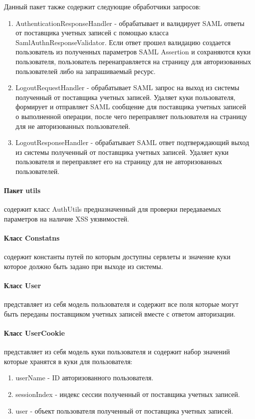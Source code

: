 Данный пакет также содержит следующие обработчики запросов:
\begin{enumerate}
\item AuthenticationResponseHandler - обрабатывает и валидирует SAML ответы от поставщика учетных записей с помощью класса SamlAuthnResponseValidator. Если ответ прошел валидацию создается пользователь из полученных параметров SAML Assertion и сохраняются куки пользователя, пользователь перенаправляется на страницу для авторизованных пользователей либо на запрашиваемый ресурс.
\item LogoutRequestHandler - обрабатывает SAML запрос на выход из системы полученный от поставщика учетных записей. Удаляет куки пользователя, формирует и отправляет SAML сообщение для поставщика учетных записей о выполненной операции, после чего переправляет пользователя на страницу для не авторизованных пользователей.
\item LogoutResponseHandler - обрабатывает SAML ответ подтверждающий выход из системы полученный от поставщика учетных записей. Удаляет куки пользователя и переправляет его на страницу для не авторизованных пользователей.
\end{enumerate}

\paragraph{Пакет utils} содержит класс AuthUtils предназначенный для проверки передаваемых параметров на наличие XSS уязвимостей.

\paragraph{Класс Constatns} содержит константы путей по которым доступны сервлеты и значение куки которое должно быть задано при выходе из системы.
\paragraph{Класс User} представляет из себя модель пользователя и содержит все поля которые могут быть переданы поставщиком учетных записей вместе с ответом авторизации.
\paragraph{Класс UserCookie} представляет из себя модель куки пользователя и содержит набор значений которые хранятся в куки для пользователя:
\begin{enumerate}
\item userName - ID авторизованного пользователя.
\item sessionIndex - индекс сессии полученный от поставщика учетных записей.
\item user - объект пользователя полученный от поставщика учетных записей.
\end{enumerate}

